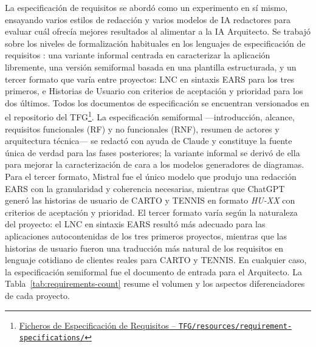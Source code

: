 La especificación de requisitos se abordó como un experimento en sí mismo, ensayando varios estilos de redacción y varios modelos de \ac{IA} redactores para evaluar cuál ofrecía mejores resultados al alimentar a la \ac{IA} Arquitecto. Se trabajó sobre los niveles de formalización habituales en los lenguajes de especificación de requisitos \cite{Sommerville:2015:SE, Pohl:2010:RE, ISO:29148:2018}: una variante informal centrada en caracterizar la aplicación libremente, una versión semiformal basada en una plantilla estructurada, y un tercer formato que varía entre proyectos: \ac{LNC} en sintaxis \ac{EARS} \cite{Mavin:2009:EARS} para los tres primeros, e Historias de Usuario \cite{Cohn:2004:UserStories} con criterios de aceptación y prioridad para los dos últimos. Todos los documentos de especificación se encuentran versionados en el repositorio del \ac{TFG}\footnote{\href{https://github.com/alu0101549491/TFG-Fabian-Gonzalez-Lence/tree/main/resources/requirement-specifications}{Ficheros de Especificación de Requisitos -- \texttt{TFG/resources/requirement-specifications/}}}. La especificación semiformal ---introducción, alcance, requisitos funcionales (RF) y no funcionales (RNF), resumen de actores y arquitectura técnica--- se redactó con ayuda de Claude y constituye la fuente única de verdad para las fases posteriores; la variante informal se derivó de ella para mejorar la caracterización de cara a los modelos generadores de diagramas. Para el tercer formato, Mistral fue el único modelo que produjo una redacción \ac{EARS} con la granularidad y coherencia necesarias, mientras que ChatGPT generó las historias de usuario de \ac{CARTO} y \ac{TENNIS} en formato \textit{HU-XX} con criterios de aceptación y prioridad. El tercer formato varía según la naturaleza del proyecto: el \ac{LNC} en sintaxis \ac{EARS} resultó más adecuado para las aplicaciones autocontenidas de los tres primeros proyectos, mientras que las historias de usuario fueron una traducción más natural de los requisitos en lenguaje cotidiano de clientes reales para \ac{CARTO} y \ac{TENNIS}. En cualquier caso, la especificación semiformal fue el documento de entrada para el Arquitecto. La Tabla~\ref{tab:requirements-count} resume el volumen y los aspectos diferenciadores de cada proyecto.

